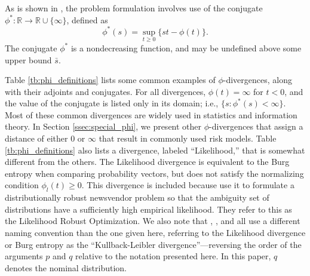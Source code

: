 \documentclass[ijoc,letterpaper]{informs3} %
\newcommand{\R}{{\mathbb{R}}}
\begin{document}
As is shown in \citep{bental2011robust}, the problem formulation involves use of the conjugate $\phi^* : \R \rightarrow \R \cup \{\infty\}$, defined as
\begin{equation} \label{eq:conjugate}
	\phi^*(s) = \sup_{t \geq 0} \{st - \phi(t)\}.
\end{equation}
The conjugate $\phi^*$ is a nondecreasing function, and may be undefined above some upper bound $\bar{s}$.

Table \ref{tb:phi_definitions} lists some common examples of $\phi$-divergences, along with their adjoints and conjugates.
For all divergences, $\phi(t) = \infty$ for $t < 0$, and the value of the conjugate is listed only in its domain; i.e., $\{s : \phi^*(s) < \infty\}$.
Most of these common divergences are widely used in statistics and information theory.
In Section \ref{ssec:special_phi}, we present other $\phi$-divergences that assign a distance of either $0$ or $\infty$ that result in commonly used risk models.
Table \ref{tb:phi_definitions} also lists a divergence, labeled ``Likelihood,'' that is somewhat different from the others.
The Likelihood divergence is equivalent to the Burg entropy when comparing probability vectors, but does not satisfy the normalizing condition $\phi_l(t) \geq 0$.
This divergence is included because \cite{wang2010likelihood} use it to formulate a distributionally robust newsvendor problem so that the ambiguity set of distributions have a sufficiently high empirical likelihood. 
They refer to this as the Likelihood Robust Optimization. 
We also note that \cite{calafiore2007ambiguous}, \cite{hukullback}, and \cite{wang2010likelihood} all use a different naming convention than the one given here, referring to the Likelihood divergence or Burg entropy as the ``Kullback-Leibler divergence''---reversing the order of the arguments $p$ and $q$ relative to the notation presented here.
In this paper, $q$ denotes the nominal distribution. 
\end{document}
